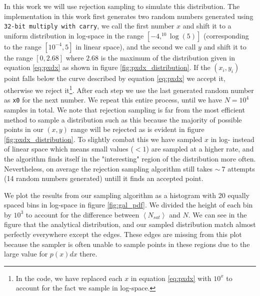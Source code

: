 In this work we will use rejection sampling to simulate this distribution. The implementation in this work first generates two random numbers generated using \texttt{32-bit multiply with carry}, we call the first number $x$ and shift it to a uniform distribution in log-space in the range $\left[-4, ^{10}\log(5)\right]$ (corresponding to the range $\left[10^{-4}, 5\right]$ in linear space), and the second we call $y$ and shift it to the range $\left[0, 2.68\right]$ where $2.68$ is the maximum of the distribution given in equation \ref{eq:pxdx} as shown in figure \ref{fig:pxdx_distribution}. If the $\left(x_i, y_i\right)$ point falls below the curve described by equation \ref{eq:pxdx} we accept it, otherwise we reject it\footnote{In the code, we have replaced each $x$ in equation \ref{eq:pxdx} with $10^x$ to account for the fact we sample in log-space.}. After each step we use the last generated random number as \texttt{x0} for the next number. We repeat this entire process, until we have $N = 10^4$ samples in total. We note that rejection sampling is far from the most efficient method to sample a distribution such as this because the majority of possible points in our $\left(x, y\right)$ range will be rejected as is evident in figure \ref{fig:pxdx_distribution}. To slightly combat this we have sampled $x$ in log- instead of linear space which means small values ($<1$) are sampled at a higher rate, and the algorithm finds itself in the "interesting" region of the distribution more often. Nevertheless, on average the rejection sampling algorithm still takes $\sim~7$ attempts (14 random numbers generated) untill it finds an accepted point.

We plot the results from our sampling algorithm as a histogram with 20 equally spaced bins in log-space in figure \ref{fig:gal_pdf}. We divided the height of each bin by $10^3$ to account for the difference between $\left<N_{sat}\right>$ and $N$. We can see in the figure that the analytical distribution, and our sampled distribution match almost perfectly everywhere except the edges. These edges are missing from this plot because the sampler is often unable to sample points in these regions due to the large value for $p(x)dx$ there. 

